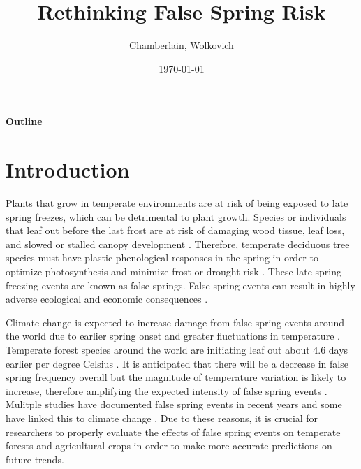 \documentclass{article}\usepackage[]{graphicx}\usepackage[]{color}
\begin{document}
\title{Rethinking False Spring Risk}
\author{Chamberlain, Wolkovich}
\date{\today}
\maketitle 

\renewcommand{\thetable}{\arabic{table}}
\renewcommand{\thefigure}{\arabic{figure}}
\renewcommand{\labelitemi}{$-$}

\begin{center}
\LARGE\textbf{Outline}
\end{center}
\section{Introduction}
Plants that grow in temperate environments are at risk of being exposed to late spring freezes, which can be detrimental to plant growth. Species or individuals that leaf out before the last frost are at risk of damaging wood tissue, leaf loss, and slowed or stalled canopy development \citep{Gu2008, Hufkens2012}. Therefore, temperate deciduous tree species must have plastic phenological responses in the spring in order to optimize photosynthesis and minimize frost or drought risk \citep{Polgar2011}. These late spring freezing events are known as false springs. False spring events can result in highly adverse ecological and economic consequences \citep{Ault2013, Knudson2012}.

Climate change is expected to increase damage from false spring events around the world due to earlier spring onset and greater fluctuations in temperature \citep{Martin2010, Inouye2008, Cannell1986}. Temperate forest species around the world are initiating leaf out about 4.6 days earlier per degree Celsius \citep{Polgar2014, Wolkovich2012}. It is anticipated that there will be a decrease in false spring frequency overall but the magnitude of temperature variation is likely to increase, therefore amplifying the expected intensity of false spring events \citep{Allstadt2015, Kodra2011}. Mulitple studies have documented false spring events in recent years \citep{Augspurger2013, Knudson2012, Augspurger2009, Gu2008} and some have linked this to climate change \citep{Muffler2016, Xin2016, Allstadt2015, Ault2013}. Due to these reasons, it is crucial for researchers to properly evaluate the effects of false spring events on temperate forests and agricultural crops in order to make more accurate predictions on future trends.
\end{document}
